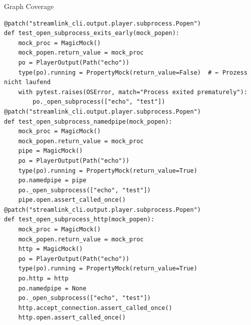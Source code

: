 \documentclass[a4paper]{scrreprt}
\newcounter{question}
\begin{document}
\begin{question}{Graph Coverage}
\begin{enumerate}[topsep=0pt, leftmargin=*]
\begin{answer}
\begin{lstlisting}[style=pythongrey]
@patch("streamlink_cli.output.player.subprocess.Popen")
def test_open_subprocess_exits_early(mock_popen):
    mock_proc = MagicMock()
    mock_popen.return_value = mock_proc
    po = PlayerOutput(Path("echo"))
    type(po).running = PropertyMock(return_value=False)  # ← Prozess nicht laufend
    with pytest.raises(OSError, match="Process exited prematurely"):
        po._open_subprocess(["echo", "test"])
@patch("streamlink_cli.output.player.subprocess.Popen")
def test_open_subprocess_namedpipe(mock_popen):
    mock_proc = MagicMock()
    mock_popen.return_value = mock_proc
    pipe = MagicMock()
    po = PlayerOutput(Path("echo"))
    type(po).running = PropertyMock(return_value=True)
    po.namedpipe = pipe
    po._open_subprocess(["echo", "test"])
    pipe.open.assert_called_once()
@patch("streamlink_cli.output.player.subprocess.Popen")
def test_open_subprocess_http(mock_popen):
    mock_proc = MagicMock()
    mock_popen.return_value = mock_proc
    http = MagicMock()
    po = PlayerOutput(Path("echo"))
    type(po).running = PropertyMock(return_value=True)
    po.http = http
    po.namedpipe = None
    po._open_subprocess(["echo", "test"])
    http.accept_connection.assert_called_once()
    http.open.assert_called_once()
    

\end{lstlisting}
\end{answer}
\end{enumerate}
\end{question}
\end{document}
